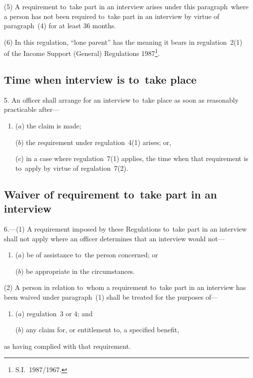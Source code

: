 \documentclass[12pt,a4paper]{article}
\begin{document}
(5) A requirement to~take part in an interview arises under this paragraph~where a person has not been required to~take part in an interview by virtue of paragraph~(4) for at least 36 months.

(6) In this regulation, “lone parent” has the meaning it bears in regulation~2(1) of the Income Support (General) Regulations 1987\footnote{S.I.~1987/1967.}.

\subsection[5. Time when interview is to~take place]{Time when interview is to~take place}

5.  An officer shall arrange for an interview to~take place as soon as reasonably practicable after—
\begin{enumerate}\item[]
($a$) the claim is made;

($b$) the requirement under regulation~4(1) arises; or,

($c$) in a case where regulation~7(1) applies, the time when that requirement is to~apply by virtue of regulation~7(2).
\end{enumerate}

\subsection[6. Waiver of requirement to~take part in an interview]{Waiver of requirement to~take part in an interview}

6.---(1)  A requirement imposed by these Regulations to~take part in an interview shall not apply where an officer determines that an interview would not—
\begin{enumerate}\item[]
($a$) be of assistance to~the person concerned; or

($b$) be appropriate in the circumstances.
\end{enumerate}

(2) A person in relation to~whom a requirement to~take part in an interview has been waived under paragraph~(1) shall be treated for the purposes of—
\begin{enumerate}\item[]
($a$) regulation~3 or 4; and

\enlargethispage{-\baselineskip}

($b$) any claim for, or entitlement to, a specified benefit,
\end{enumerate}
as having complied with that requirement.
\end{document}
